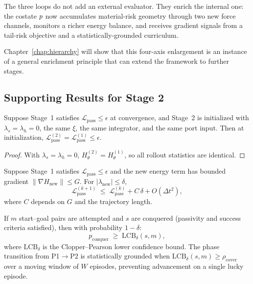 The three loops do not add an external evaluator.
They enrich the internal one: the costate $p$ now accumulates
material-risk geometry through two new force channels, monitors a
richer energy balance, and receives gradient signals from a
tail-risk objective and a statistically-grounded curriculum.

Chapter~\ref{chap:hierarchy} will show that this four-axis
enlargement is an instance of a general enrichment principle
that can extend the framework to further stages.

\subsection*{Supporting Results for Stage 2}

\begin{theorem}
\label{thm:ch4:passivity_init}
Suppose Stage~1 satisfies $\mathcal{L}_{\mathrm{pass}} \leq \epsilon$ at
convergence, and Stage~2 is initialized with $\lambda_s = \lambda_h = 0$,
the same $\xi$, the same integrator, and the same port input.
Then at initialization, $\mathcal{L}_{\mathrm{pass}}^{(2)} = \mathcal{L}_{\mathrm{pass}}^{(1)} \leq \epsilon$.
\end{theorem}

\begin{proof}
With $\lambda_s = \lambda_h = 0$, $H_\theta^{(2)} = H_\theta^{(1)}$,
so all rollout statistics are identical.
\end{proof}

\begin{theorem}
\label{thm:ch4:passivity_cont}
Suppose Stage~1 satisfies $\mathcal{L}_{\mathrm{pass}} \leq \epsilon$ and
the new energy term has bounded gradient $\|\nabla H_{\mathrm{new}}\| \leq G$.
For $|\lambda_{\mathrm{new}}| \leq \delta$,
\[
  \mathcal{L}_{\mathrm{pass}}^{(k+1)}
  \;\leq\;
  \mathcal{L}_{\mathrm{pass}}^{(k)} + C\,\delta + O(\Delta t^2),
\]
where $C$ depends on $G$ and the trajectory length.
\end{theorem}

\begin{proposition}
\label{prop:ch4:coverage_pac}
If $m$ start--goal pairs are attempted and $s$ are conquered (passivity
and success criteria satisfied), then with probability $1-\delta$:
\[
  p_{\mathrm{conquer}} \;\geq\; \mathrm{LCB}_\delta(s, m),
\]
where $\mathrm{LCB}_\delta$ is the Clopper--Pearson lower confidence bound.
The phase transition from P1$\to$P2 is statistically grounded when
$\mathrm{LCB}_\delta(s,m) \geq \rho_{\mathrm{cover}}$ over a moving window
of $W$ episodes, preventing advancement on a single lucky episode.
\end{proposition}